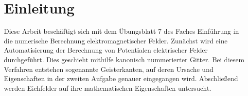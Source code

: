 \chapter{Einleitung}\label{sec:intro}
Diese Arbeit beschäftigt sich mit dem Übungsblatt 7 des Faches \glqq Einführung in die numerische Berechnung elektromagnetischer Felder\grqq{}. Zunächst wird eine Automatisierung der Berechnung von Potentialen elektrischer Felder durchgeführt. Dies geschieht mithilfe kanonisch nummerierter Gitter. Bei diesem Verfahren entstehen sogenannte Geisterkanten, auf deren Ursache und Eigenschaften in der zweiten Aufgabe genauer eingegangen wird. Abschließend werden Eichfelder auf ihre mathematischen Eigenschaften untersucht.